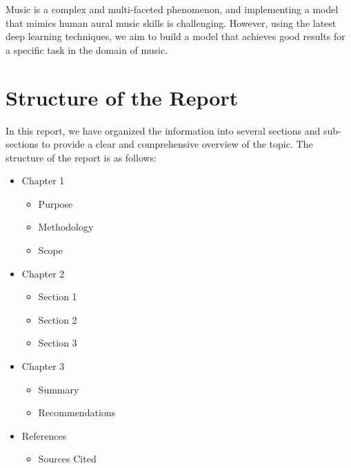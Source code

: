 Music is a complex and multi-faceted phenomenon, and implementing a model that mimics human aural music skills is challenging. However, using the latest deep learning techniques, we aim to build a model that achieves good results for a specific task in the domain of music.

\section{Structure of the Report}

In this report, we have organized the information into several sections and sub-sections to provide a clear and comprehensive overview of the topic. The structure of the report is as follows:

\begin{itemize}
\item Chapter 1
  \begin{itemize}
  \item Purpose
  \item Methodology
  \item Scope
  \end{itemize}
\item Chapter 2
  \begin{itemize}
  \item Section 1
  \item Section 2
  \item Section 3
  \end{itemize}
\item Chapter 3
  \begin{itemize}
  \item Summary
  \item Recommendations
  \end{itemize}
\item References
  \begin{itemize}
  \item Sources Cited
  \end{itemize}
\end{itemize}

\newpage


